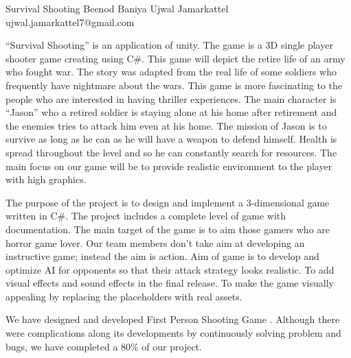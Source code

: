  \begin{conf-abstract}[]
 {Survival Shooting}
 {Beenod Baniya 
 	Ujwal Jamarkattel
 }
{ujwal.jamarkattel7@gmail.com}

“Survival Shooting” is an application of unity. The game is a 3D single player shooter game creating using C\#. This game will depict the retire life of an army who fought war. The story was adapted from the real life of some soldiers who frequently have nightmare about the wars. This game is more fascinating to the people who are interested in having thriller experiences. The main character is “Jason” who a retired soldier is staying alone at his home after retirement and the enemies tries to attack him even at his home. The mission of Jason is to survive as long as he can as he will have a weapon to defend himself. Health is spread throughout the level and so he can constantly search for resources. The main focus on our game will be to provide realistic environment to the player with high graphics.

The purpose of the project is to design and implement a 3-dimensional game written in C\#. The project includes a complete level of game with documentation. The main target of the game is to aim those gamers who are horror game lover. Our team members don’t take aim at developing an instructive game; instead the aim is action. Aim of game is to develop and optimize AI for opponents so that their attack strategy looks realistic. To add visual effects and sound effects in the final release. To make the game visually appealing by replacing the placeholders with real assets.

We have designed and developed First Person Shooting Game . Although there were complications along its developments by continuously solving problem and bugs, we have completed  a 80\% of our project. 
 \end{conf-abstract}